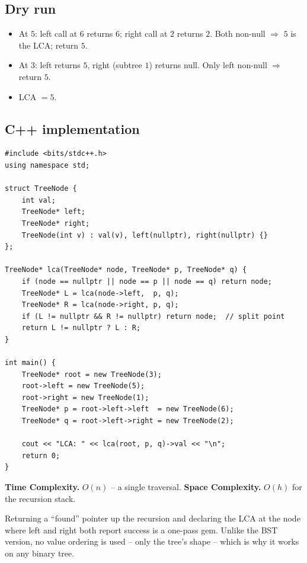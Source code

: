 \subsection*{Dry run}


\begin{itemize}
  \item At $5$: left call at $6$ returns $6$; right call at $2$ returns
        $2$. Both non-null $\Rightarrow$ $5$ is the LCA; return $5$.
  \item At $3$: left returns $5$, right (subtree $1$) returns null. Only
        left non-null $\Rightarrow$ return $5$.
  \item LCA $=5$.
\end{itemize}

\subsection*{C++ implementation}

\begin{lstlisting}
#include <bits/stdc++.h>
using namespace std;

struct TreeNode {
    int val;
    TreeNode* left;
    TreeNode* right;
    TreeNode(int v) : val(v), left(nullptr), right(nullptr) {}
};

TreeNode* lca(TreeNode* node, TreeNode* p, TreeNode* q) {
    if (node == nullptr || node == p || node == q) return node;
    TreeNode* L = lca(node->left,  p, q);
    TreeNode* R = lca(node->right, p, q);
    if (L != nullptr && R != nullptr) return node;  // split point
    return L != nullptr ? L : R;
}

int main() {
    TreeNode* root = new TreeNode(3);
    root->left = new TreeNode(5);
    root->right = new TreeNode(1);
    TreeNode* p = root->left->left  = new TreeNode(6);
    TreeNode* q = root->left->right = new TreeNode(2);

    cout << "LCA: " << lca(root, p, q)->val << "\n";
    return 0;
}
\end{lstlisting}

\begin{complexitybox}
\textbf{Time Complexity.} $O(n)$ -- a single traversal. \textbf{Space
Complexity.} $O(h)$ for the recursion stack.
\end{complexitybox}

\begin{takeawaybox}
Returning a ``found'' pointer up the recursion and declaring the LCA at
the node where left and right both report success is a one-pass gem. Unlike
the BST version, no value ordering is used -- only the tree's shape --
which is why it works on any binary tree.
\end{takeawaybox}
